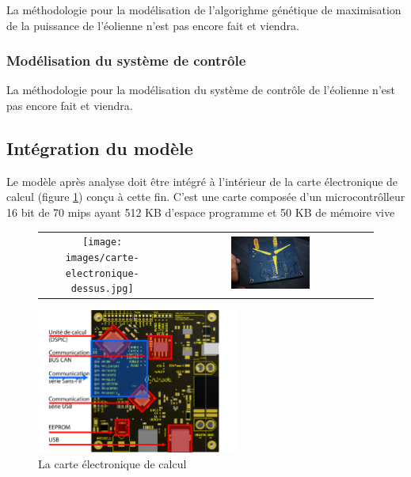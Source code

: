 La méthodologie pour la modélisation de l'algorighme génétique de maximisation de la puissance de l'éolienne n'est pas encore fait et viendra.

\subsubsection{Modélisation du système de contrôle}

La méthodologie pour la modélisation du système de contrôle de l'éolienne n'est pas encore fait et viendra.

\subsection{Intégration du modèle} %
\label{sub:Intégration du modèle}

Le modèle après analyse doit être intégré à l'intérieur de la carte électronique de calcul (figure \ref{fig:carte}) conçu à cette fin. C'est une carte composée d'un microcontrôlleur 16 bit de 70 mips ayant 512 KB d'espace programme et 50 KB de mémoire vive

\begin{figure}[H]
\label{fig:carte}
\centering
\begin{tabular}{cc}
\texttt{[image: images/carte-electronique-dessus.jpg]} &
\includegraphics[width=0.4\textwidth]{images/carte-electronique-dessous.jpg}
\end{tabular}
\includegraphics[width=0.6\textwidth]{images/carte-electronique-annote.pdf}
\caption{La carte électronique de calcul}
\end{figure}

